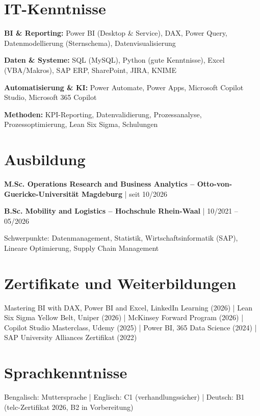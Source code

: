 \documentclass[10pt,a4paper]{article}
\newcommand{\entry}[2]{%
  \vspace{0.22em}%
  {\bfseries #1} | {\color{muted}#2}\par}
\newcommand{\skill}[2]{{\bfseries #1:} #2\par\vspace{0.12em}}
\begin{document}
\section{IT-Kenntnisse}
\skill{BI \& Reporting}{Power BI (Desktop \& Service), DAX, Power Query, Datenmodellierung (Sternschema), Datenvisualisierung}
\skill{Daten \& Systeme}{SQL (MySQL), Python (gute Kenntnisse), Excel (VBA/Makros), SAP ERP, SharePoint, JIRA, KNIME}
\skill{Automatisierung \& KI}{Power Automate, Power Apps, Microsoft Copilot Studio, Microsoft 365 Copilot}
\skill{Methoden}{KPI-Reporting, Datenvalidierung, Prozessanalyse, Prozessoptimierung, Lean Six Sigma, Schulungen}

\section{Ausbildung}
\entry{M.Sc. Operations Research and Business Analytics – Otto-von-Guericke-Universität Magdeburg}{seit 10/2026}
\entry{B.Sc. Mobility and Logistics – Hochschule Rhein-Waal}{10/2021 – 05/2026}
{\small Schwerpunkte: Datenmanagement, Statistik, Wirtschaftsinformatik (SAP), Lineare Optimierung, Supply Chain Management\par}

\section{Zertifikate und Weiterbildungen}
{\small
Mastering BI with DAX, Power BI and Excel, LinkedIn Learning (2026) | Lean Six Sigma Yellow Belt, Uniper (2026) | McKinsey Forward Program (2026) | Copilot Studio Masterclass, Udemy (2025) | Power BI, 365 Data Science (2024) | SAP University Alliances Zertifikat (2022)\par}

\section{Sprachkenntnisse}
Bengalisch: Muttersprache | Englisch: C1 (verhandlungssicher) | Deutsch: B1 (telc-Zertifikat 2026, B2 in Vorbereitung)
\end{document}
